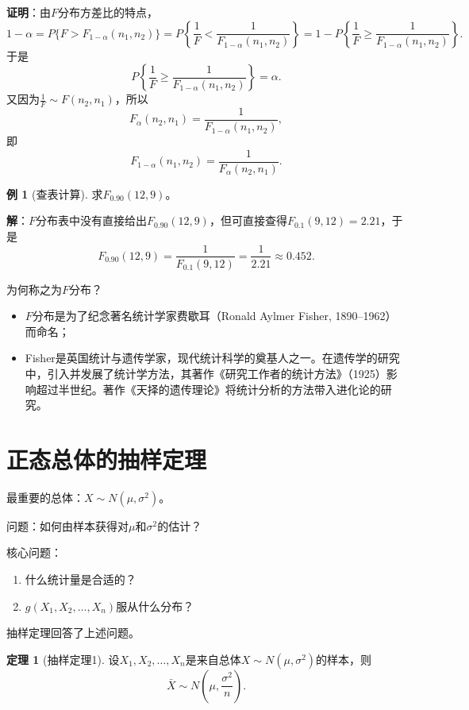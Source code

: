 \documentclass[11pt,a4paper]{report}
\theoremstyle{definition}
\newtheorem{example}{例}[chapter]
\newtheorem{theorem}{定理}[chapter]
\begin{document}
\textbf{证明}：由$F$分布方差比的特点，
\[
1-\alpha=P\{F>F_{1-\alpha}(n_{1},n_{2})\}=P\left\{\frac{1}{F}<\frac{1}{F_{1-\alpha}(n_{1},n_{2})}\right\}=1-P\left\{\frac{1}{F}\geq\frac{1}{F_{1-\alpha}(n_{1},n_{2})}\right\}.
\]
于是
\[
P\left\{\frac{1}{F}\geq\frac{1}{F_{1-\alpha}(n_{1},n_{2})}\right\}=\alpha.
\]
又因为$\frac{1}{F}\sim F(n_{2},n_{1})$，所以
\[
F_{\alpha}(n_{2},n_{1})=\frac{1}{F_{1-\alpha}(n_{1},n_{2})},
\]
即
\[
F_{1-\alpha}(n_{1},n_{2})=\frac{1}{F_{\alpha}(n_{2},n_{1})}.
\]

\begin{example}[查表计算]
求$F_{0.90}(12,9)$。

\textbf{解}：$F$分布表中没有直接给出$F_{0.90}(12,9)$，但可直接查得$F_{0.1}(9,12)=2.21$，于是
\[
F_{0.90}(12,9)=\frac{1}{F_{0.1}(9,12)}=\frac{1}{2.21}\approx 0.452.
\]
\end{example}

为何称之为$F$分布？
\begin{itemize}[leftmargin=2em]
    \item $F$分布是为了纪念著名统计学家费歇耳（Ronald Aylmer Fisher, 1890--1962）而命名；
    \item Fisher是英国统计与遗传学家，现代统计科学的奠基人之一。在遗传学的研究中，引入并发展了统计学方法，其著作《研究工作者的统计方法》（1925）影响超过半世纪。著作《天择的遗传理论》将统计分析的方法带入进化论的研究。
\end{itemize}

\section{正态总体的抽样定理}

最重要的总体：$X\sim N(\mu,\sigma^{2})$。

问题：如何由样本获得对$\mu$和$\sigma^{2}$的估计？

核心问题：
\begin{enumerate}[label=\arabic*.,leftmargin=2em]
    \item 什么统计量是合适的？
    \item $g(X_{1},X_{2},\ldots,X_{n})$服从什么分布？
\end{enumerate}

抽样定理回答了上述问题。

\begin{theorem}[抽样定理1]
设$X_{1},X_{2},\ldots,X_{n}$是来自总体$X\sim N(\mu,\sigma^{2})$的样本，则
\[
\bar{X}\sim N\left(\mu,\frac{\sigma^{2}}{n}\right).
\]
\end{theorem}
\end{document}
